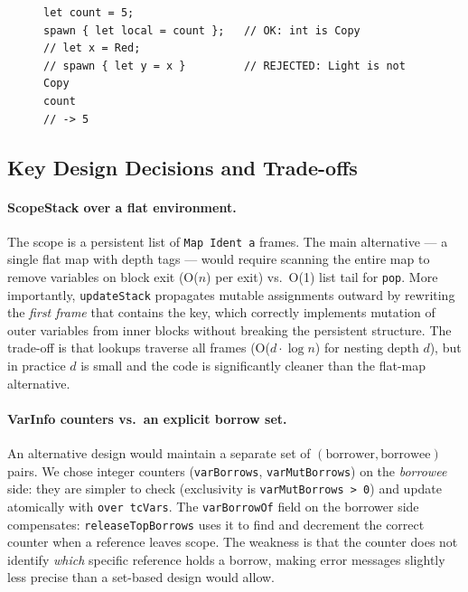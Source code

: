 \begin{figure}[ht!]
    \centering
    \begin{minipage}{.9\linewidth}
\begin{lstlisting}
let count = 5;
spawn { let local = count };   // OK: int is Copy
// let x = Red;
// spawn { let y = x }         // REJECTED: Light is not Copy
count
// -> 5
\end{lstlisting}
    \end{minipage}
    \label{lst:spawn-example}
\end{figure}

\subsection{Key Design Decisions and Trade-offs}

\paragraph{ScopeStack over a flat environment.}
The scope is a persistent list of \texttt{Map Ident a} frames.
The main alternative --- a single flat map with depth tags --- would require
scanning the entire map to remove variables on block exit (O($n$) per exit)
vs.\ O(1) list tail for \texttt{pop}.
More importantly, \texttt{updateStack} propagates mutable assignments outward
by rewriting the \emph{first frame} that contains the key, which correctly
implements mutation of outer variables from inner blocks without breaking the
persistent structure.
The trade-off is that lookups traverse all frames
(O($d \cdot \log n$) for nesting depth $d$), but in practice $d$ is small
and the code is significantly cleaner than the flat-map alternative.

\paragraph{VarInfo counters vs.\ an explicit borrow set.}
An alternative design would maintain a separate set of
$(\text{borrower}, \text{borrowee})$ pairs.
We chose integer counters (\texttt{varBorrows}, \texttt{varMutBorrows}) on
the \emph{borrowee} side: they are simpler to check (exclusivity is
\texttt{varMutBorrows > 0}) and update atomically with \texttt{over tcVars}.
The \texttt{varBorrowOf} field on the borrower side compensates:
\texttt{releaseTopBorrows} uses it to find and decrement the correct counter
when a reference leaves scope.
The weakness is that the counter does not identify \emph{which} specific
reference holds a borrow, making error messages slightly less precise than
a set-based design would allow.

